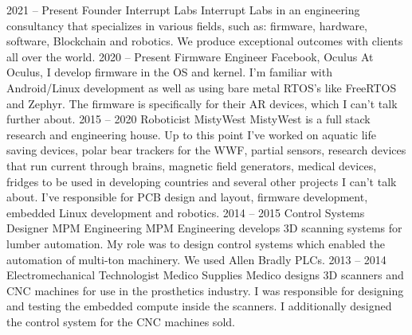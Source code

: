 \documentclass[10pt]{developercv} %
\begin{document}
\begin{entrylist}
    \entry
		{2021 -- Present}
		{Founder}
		{Interrupt Labs}
        {
        Interrupt Labs in an engineering consultancy that specializes in various fields, such as: firmware, hardware, software, Blockchain and robotics. We produce exceptional outcomes with clients all over the world. 
        }
	\entry
		{2020 -- Present}
		{Firmware Engineer}
		{Facebook, Oculus}
        {
        At Oculus, I develop firmware in the OS and kernel. I'm familiar with Android/Linux development as well as using bare metal RTOS's like FreeRTOS and Zephyr. The firmware is specifically for their AR devices, which I can't talk further about.
        }
	\entry
		{2015 -- 2020}
		{Roboticist}
		{MistyWest}
        {
        MistyWest is a full stack research and engineering house. Up to this point I've worked on aquatic life saving devices, polar bear trackers for the WWF, partial sensors, research devices that run current through brains, magnetic field generators, medical devices, fridges to be used in developing countries and several other projects I can't talk about.  I've responsible for PCB design and layout, firmware development, embedded Linux development and robotics.
        }
    \entry
		{2014 -- 2015}
		{Control Systems Designer}
		{MPM Engineering}
		{
        MPM Engineering develops 3D scanning systems for lumber automation. My role was to design control systems which enabled the automation of multi-ton machinery. We used Allen Bradly PLCs.
        }
	\entry
		{2013 -- 2014}
		{Electromechanical Technologist}
		{Medico Supplies}
		{
        Medico designs 3D scanners and CNC machines for use in the prosthetics industry. I was responsible for designing and testing the embedded compute inside the scanners. I additionally designed the control system for the CNC machines sold.
        }
\end{entrylist}



\end{document}
